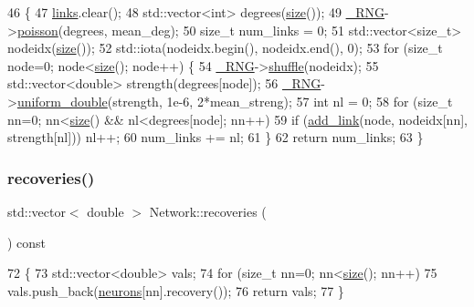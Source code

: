 \begin{DoxyCode}
46                                                                                 \{
47     \hyperlink{classNetwork_aef1609a9a6b865651417ce995b4575a8}{links}.clear();
48     std::vector<int> degrees(\hyperlink{classNetwork_a41c54d12d861883170b5c5abca3a7bc8}{size}());
49     \hyperlink{main_8cpp_ad20d7a8b3940b60cfd9cd7188fb503ea}{\_RNG}->\hyperlink{classRandomNumbers_a69e33058b8a923f9597cf13421d5fcd4}{poisson}(degrees, mean\_deg);
50     \textcolor{keywordtype}{size\_t} num\_links = 0;
51     std::vector<size\_t> nodeidx(\hyperlink{classNetwork_a41c54d12d861883170b5c5abca3a7bc8}{size}());
52     std::iota(nodeidx.begin(), nodeidx.end(), 0);
53     \textcolor{keywordflow}{for} (\textcolor{keywordtype}{size\_t} node=0; node<\hyperlink{classNetwork_a41c54d12d861883170b5c5abca3a7bc8}{size}(); node++) \{
54         \hyperlink{main_8cpp_ad20d7a8b3940b60cfd9cd7188fb503ea}{\_RNG}->\hyperlink{classRandomNumbers_a851aaa7e46922dc22ce984b21b474a4e}{shuffle}(nodeidx);
55         std::vector<double> strength(degrees[node]);
56         \hyperlink{main_8cpp_ad20d7a8b3940b60cfd9cd7188fb503ea}{\_RNG}->\hyperlink{classRandomNumbers_ae226c129494f9055ac37ed1af943d010}{uniform\_double}(strength, 1e-6, 2*mean\_streng);
57         \textcolor{keywordtype}{int} nl = 0;
58         \textcolor{keywordflow}{for} (\textcolor{keywordtype}{size\_t} nn=0; nn<\hyperlink{classNetwork_a41c54d12d861883170b5c5abca3a7bc8}{size}() && nl<degrees[node]; nn++)
59             \textcolor{keywordflow}{if} (\hyperlink{classNetwork_a6ebe0899329973e4924997a25e205856}{add\_link}(node, nodeidx[nn], strength[nl])) nl++;
60         num\_links += nl;
61     \}
62     \textcolor{keywordflow}{return} num\_links;
63 \}
\end{DoxyCode}
\mbox{\label{classNetwork_a2e9dbb815c622cccdd50186ae8c9f4a7}} 
\subsubsection{\texorpdfstring{recoveries()}{recoveries()}}
{\footnotesize\ttfamily std\+::vector$<$ double $>$ Network\+::recoveries (\begin{DoxyParamCaption}{ }\end{DoxyParamCaption}) const}


\begin{DoxyCode}
72                                             \{
73     std::vector<double> vals;
74     \textcolor{keywordflow}{for} (\textcolor{keywordtype}{size\_t} nn=0; nn<\hyperlink{classNetwork_a41c54d12d861883170b5c5abca3a7bc8}{size}(); nn++)
75         vals.push\_back(\hyperlink{classNetwork_a1b7832bc2c7b8855cdc3b2d6329eff9d}{neurons}[nn].recovery());
76     \textcolor{keywordflow}{return} vals;
77 \}
\end{DoxyCode}
\mbox{\label{classNetwork_ad91ae24f308dd2b46ff76396fcdb9765}} 
